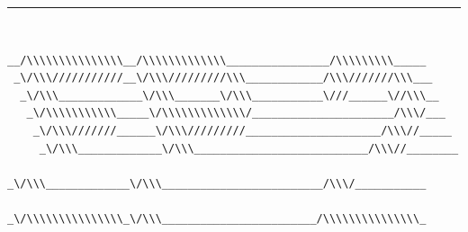 \documentclass [a4paper,10pt]{article}
\begin{document}
\noindent\rule{\textwidth}{2pt}\\[-3mm]
    \linespread {0.7} {
    \begin{Verbatim}[fontsize=\small]
__/\\\\\\\\\\\\\\\__/\\\\\\\\\\\\\________________/\\\\\\\\\_____        
 _\/\\\///////////__\/\\\/////////\\\____________/\\\///////\\\___       
  _\/\\\_____________\/\\\_______\/\\\___________\///______\//\\\__      
   _\/\\\\\\\\\\\_____\/\\\\\\\\\\\\\/______________________/\\\/___     
    _\/\\\///////______\/\\\/////////_____________________/\\\//_____    
     _\/\\\_____________\/\\\___________________________/\\\//________   
      _\/\\\_____________\/\\\_________________________/\\\/___________  
       _\/\\\\\\\\\\\\\\\_\/\\\________________________/\\\\\\\\\\\\\\\_ 

\end{Verbatim}}
\end{document}
